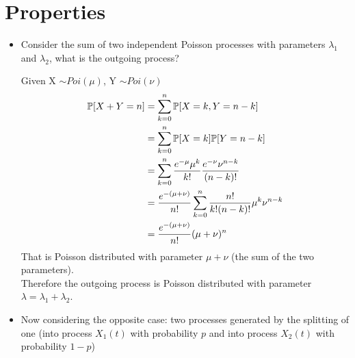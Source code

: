 \section{Properties}

\begin{itemize}
	\item Consider the sum of two independent Poisson processes with parameters $\lambda_1$ and $\lambda_2$, what is the outgoing process?
		 \begin{figure}[H]
			\centering
		 \end{figure}
			Given X $\sim Poi(\mu)$, Y $\sim Poi(\nu)$
			\begin{equation}
			 \begin{split}
				  \mathbb{P}[X + Y = n] &= \sum\limits_{k=0}^n \mathbb{P}[X = k, Y = n - k] \\
				 &= \sum\limits_{k=0}^n \mathbb{P}[X = k] \mathbb{P}[Y = n - k] \\
				 &= \sum\limits_{k=0}^n \frac{e^{-\mu} \mu^k}{k!} \frac{e^{-\nu}\nu^{n-k}}{(n-k)!}\\
				 &= \frac{e^{-(\mu + \nu)}}{n!}\sum\limits_{k=0}^n \frac{n!}{k!(n-k)!}\mu^k\nu^{n-k}\\
				 &= \frac{e^{-(\mu + \nu)}}{n!}(\mu + \nu)^n
			  \end{split}
			 \end{equation}
			 That is Poisson distributed with parameter $\mu + \nu$ (the sum of the two parameters). \\
			 Therefore the outgoing process is Poisson distributed with parameter $\lambda = \lambda_1 + \lambda_2$.
	  \item Now considering the opposite case: two processes generated by the splitting of one (into process $X_1(t)$ with probability $p$ and into process $X_2(t)$ with probability $1-p$)
			 \begin{figure}[H]
					\centering
\end{figure}
\end{itemize}
